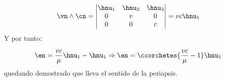     \begin{equation}
        \vn \wedge \cn = \begin{vmatrix}
            \hnu_1 & \hnu_2 & \hnu_3 \\
            0 & v & 0 \\
            0 & 0 & c
        \end{vmatrix} = v c \hnu_1
    \end{equation}
    Y por tanto:

    \begin{equation}
        \en = \frac{vc}{\mu} \hnu_1 - \hnu_1 \Rightarrow \en = \ccorchetes{\frac{vc}{\mu}-1}\hnu_1
    \end{equation}
    quedando demostrado que lleva el sentido de la periapsis.
